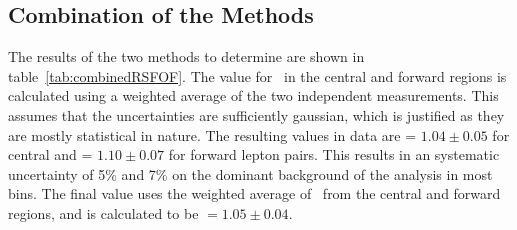 \subsection{Combination of the Methods}
The results of the two methods to determine \rsfof are shown in table~\ref{tab:combinedRSFOF}.
The value for \rsfof\ in the central and forward regions is calculated using a weighted average of the two independent measurements.
This assumes that the uncertainties are sufficiently gaussian,
which is justified as they are mostly statistical in nature.
The resulting values in data are \rsfof = $1.04\pm0.05$ for central and \rsfof = $1.10\pm0.07$ for forward lepton pairs.
This results in an systematic uncertainty of 5\% and 7\% on the dominant background of the analysis in most bins.
The final value uses the weighted average of \rsfof\ from the central and forward regions,
and is calculated to be \rsfof $ = 1.05 \pm 0.04$.

